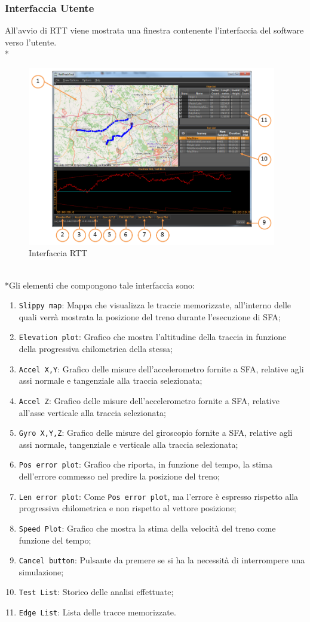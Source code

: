 \subsubsection{Interfaccia Utente}
All'avvio di RTT viene mostrata una finestra contenente l'interfaccia del software verso l'utente.\\*
\begin{figure}[h]
	\centering
	\includegraphics[height=7.8cm,width=\linewidth]{img/rtthci}
	\caption{Interfaccia RTT}
	\label{fig:rtt}
\end{figure}
\\*Gli elementi che compongono tale interfaccia sono:
\begin{enumerate}
\item \texttt{Slippy map}: Mappa che visualizza le traccie memorizzate, all'interno delle quali verr\`a mostrata la posizione del treno durante l'esecuzione di SFA;
\item \texttt{Elevation plot}: Grafico che mostra l'altitudine della traccia in funzione della progressiva chilometrica della stessa;
\item \texttt{Accel X,Y}: Grafico delle misure dell'accelerometro fornite a SFA, relative agli assi normale e tangenziale alla traccia selezionata;
\item \texttt{Accel Z}: Grafico delle misure dell'accelerometro fornite a SFA, relative all'asse verticale alla traccia selezionata; 
\item \texttt{Gyro X,Y,Z}: Grafico delle misure del giroscopio fornite a SFA, relative agli assi normale, tangenziale e verticale alla traccia selezionata;
\item \texttt{Pos error plot}: Grafico che riporta, in funzione del tempo, la stima dell'errore commesso nel predire la posizione del treno;
\item \texttt{Len error plot}: Come \texttt{Pos error plot}, ma l'errore \`e espresso rispetto alla progressiva chilometrica e non rispetto al vettore posizione;
\item \texttt{Speed Plot}: Grafico che mostra la stima della velocit\`a del treno come funzione del tempo;
\item \texttt{Cancel button}: Pulsante da premere se si ha la necessit\`a di interrompere una simulazione;
\item \texttt{Test List}: Storico delle analisi effettuate;
\item \texttt{Edge List}: Lista delle tracce memorizzate.
\end{enumerate}

